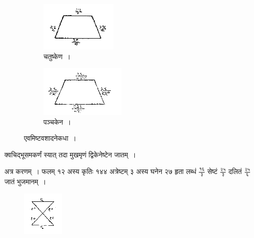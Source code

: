 \documentclass[11pt, openany]{book}
\begin{document}
\begin{figure}[h!]
     \centering
     \begin{subfigure}[b]{0.45\textwidth}
         \centering
          \captionsetup{labelformat=empty}
          \caption{चतुष्केण~।}
\vspace{-2mm}
         \includegraphics[scale=0.9]{graphics/capture126.png}
     \end{subfigure}
     \hfill
     \begin{subfigure}[b]{0.45\textwidth}
         \centering
        \captionsetup{labelformat=empty}
          \caption{पञ्चकेन~।}
\vspace{-2mm}
         \includegraphics[scale=0.9]{graphics/capture126'.png}
     \end{subfigure}
    \captionsetup{labelformat=empty}
\vspace{-2mm}
          \caption{एवमिष्टवशादनेकधा~।}
\end{figure}
\vspace{-2mm}

 क्वचिद्भूसमकर्णं स्यात् तदा मुखमृणं द्विकेनेष्टेन जातम्~। 
\newpage

 अत्र करणम्~। फलम् १२ अस्य कृतिः १४४ अत्रेष्टम् ३ अस्य
घनेन २७ हृता लब्धं $\frac{\mbox{१६}}{\mbox{३}}$ सेष्टं
$\frac{\mbox{२५}}{\mbox{३}}$ दलितं $\frac{\mbox{२५}}{\mbox{६}}$ जातं भुजमानम्~। 
\vspace{-2mm}

\begin{figure}[h!]
    \centering
    \includegraphics[scale=0.9]{graphics/capture127.png}
\end{figure}
\vspace{-2mm}
\end{document}
